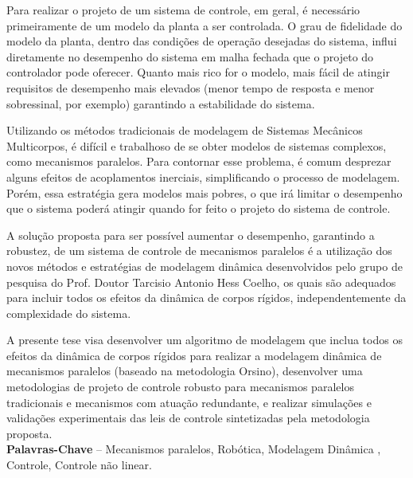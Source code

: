 \documentclass[]{politex}
\begin{document}


\begin{resumo}
Para realizar o projeto de um sistema de controle, em geral, \'e necess\'ario primeiramente de um modelo da planta a ser controlada. O grau de fidelidade do modelo da planta, dentro das condi\c{c}\~oes de opera\c{c}\~ao desejadas do sistema, influi diretamente no desempenho do sistema em malha fechada que o projeto do controlador pode oferecer. Quanto mais rico for o modelo, mais f\'acil de atingir requisitos de desempenho mais elevados (menor tempo de resposta e menor sobressinal, por exemplo) garantindo a estabilidade do sistema.

Utilizando os m\'etodos tradicionais de modelagem de Sistemas Mec\^anicos Multicorpos, \'e dif\'icil e trabalhoso de se obter modelos de sistemas complexos, como mecanismos paralelos. Para contornar esse problema, \'e comum desprezar alguns efeitos de acoplamentos inerciais, simplificando o processo de modelagem. Por\'em, essa estrat\'egia gera modelos mais pobres, o que ir\'a limitar o desempenho que o sistema poder\'a atingir quando for feito o projeto do sistema de controle.

A solu\c{c}\~ao proposta para ser poss\'ivel aumentar o desempenho, garantindo a robustez, de um sistema de controle de mecanismos paralelos \'e a utiliza\c{c}\~ao dos novos m\'etodos e estratégias de modelagem din\^amica desenvolvidos pelo grupo de pesquisa do Prof. Doutor Tarcisio Antonio Hess Coelho, os quais s\~ao adequados para incluir todos os efeitos da din\^amica de corpos r\'igidos, independentemente da complexidade do sistema.

A presente tese visa desenvolver um algoritmo de modelagem que inclua todos os efeitos da din\^amica de corpos r\'igidos para realizar a modelagem din\^amica de mecanismos paralelos (baseado na metodologia Orsino), desenvolver uma metodologias de projeto de controle robusto para mecanismos paralelos tradicionais e mecanismos com atua\c{c}\~ao redundante, e realizar simulações e valida\c{c}\~oes experimentais das leis de controle sintetizadas pela metodologia proposta.
%
\\[3\baselineskip]
%
\textbf{Palavras-Chave} -- Mecanismos paralelos, Robótica, Modelagem Dinâmica , Controle, Controle não linear.
\end{resumo}
\end{document}

